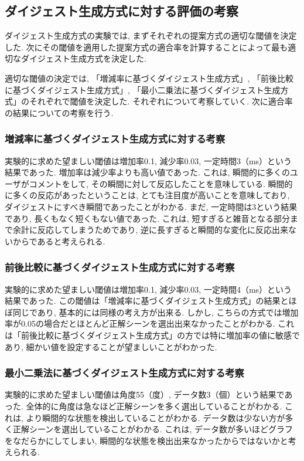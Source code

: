 \subsection{ダイジェスト生成方式に対する評価の考察}
ダイジェスト生成方式の実験では, まずそれぞれの提案方式の適切な閾値を決定した. 次にその閾値を適用した提案方式の適合率を計算することによって最も適切なダイジェスト生成方式を決定した.

適切な閾値の決定では, 「増減率に基づくダイジェスト生成方式」, 「前後比較に基づくダイジェスト生成方式」, 「最小二乗法に基づくダイジェスト生成方式」のそれぞれで閾値を決定した. それぞれについて考察していく. 次に適合率の結果についての考察を行う.

\subsubsection{増減率に基づくダイジェスト生成方式に対する考察}
実験的に求めた望ましい閾値は増加率0.1, 減少率0.03, 一定時間3（ms）という結果であった. 増加率は減少率よりも高い値であった. これは, 瞬間的に多くのユーザがコメントをして, その瞬間に対して反応したことを意味している. 瞬間的に多くの反応があったということは, とても注目度が高いことを意味しており, ダイジェストにすべき瞬間であったことがわかる. まだ, 一定時間は3という結果であり, 長くもなく短くもない値であった. これは, 短すぎると雑音となる部分まで余計に反応してしまうためであり, 逆に長すぎると瞬間的な変化に反応出来ないからであると考えられる.

\subsubsection{前後比較に基づくダイジェスト生成方式に対する考察}
実験的に求めた望ましい閾値は増加率0.1, 減少率0.03, 一定時間4（ms）という結果であった. この閾値は「増減率に基づくダイジェスト生成方式」の結果とほぼ同じであり, 基本的には同様の考え方が出来る. しかし, こちらの方式では増加率が0.05の場合だとほとんど正解シーンを選出出来なかったことがわかる. これは「前後比較に基づくダイジェスト生成方式」の方では特に増加率の値に敏感であり, 細かい値を設定することが望ましいことがわかった.

\subsubsection{最小二乗法に基づくダイジェスト生成方式に対する考察}
実験的に求めた望ましい閾値は角度55（度）, データ数3（個）という結果であった. 全体的に角度は急なほど正解シーンを多く選出していることがわかる. これは, より瞬間的な状態を検出していることがわかる. データ数は少ない方が多く正解シーンを選出していることがわかる. これは, データ数が多いほどグラフをなだらかにしてしまい, 瞬間的な状態を検出出来なかったからではないかと考えられる.

